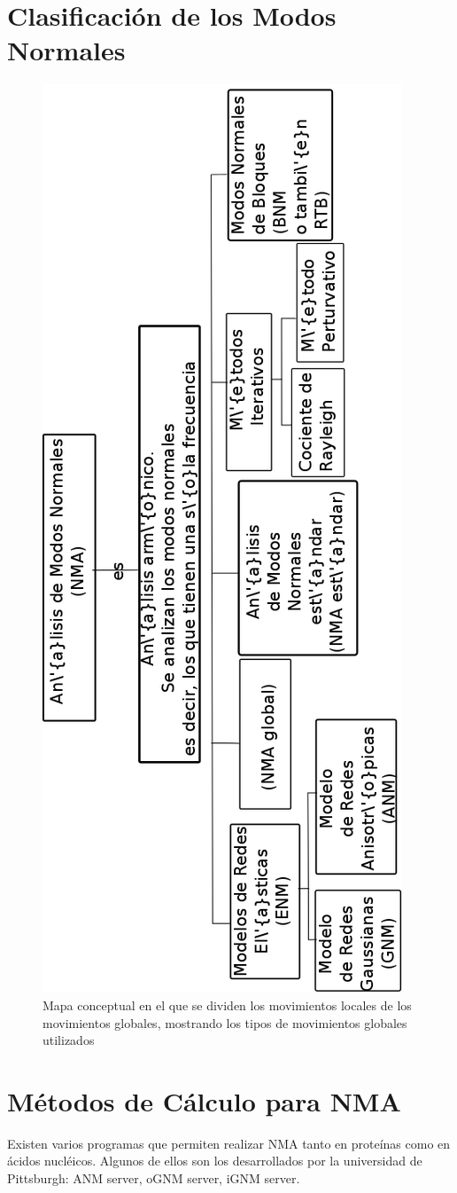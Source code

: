\section{Clasificaci\'{o}n de los Modos Normales}
\begin{figure}
\centering%
%
\includegraphics[scale=0.4]{Kap2/mapa.png}%
\caption{Mapa conceptual en el que se dividen los movimientos locales de los movimientos globales, mostrando los tipos de movimientos globales utilizados} \label{fig:movs}
\end{figure}
\section{M\'{e}todos de C\'{a}lculo para NMA}

Existen varios programas que permiten realizar NMA tanto en prote\'{i}nas como en \'{a}cidos nucl\'{e}icos. Algunos de ellos son los desarrollados por la universidad de Pittsburgh: ANM server, oGNM server, iGNM server.